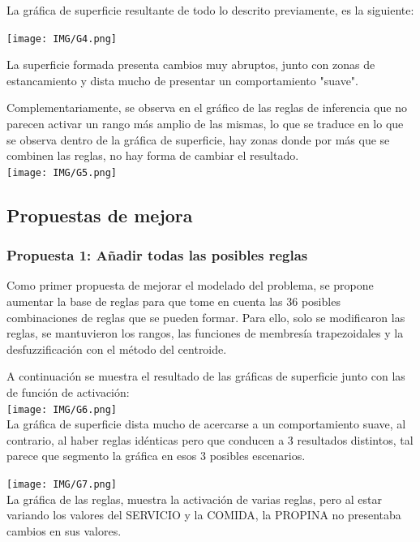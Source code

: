 \documentclass[11pt, letterpaper]{article}
\begin{document}
La gráfica de superficie resultante de todo lo descrito previamente, es la siguiente:

\texttt{[image: IMG/G4.png]}

La superficie formada presenta cambios muy abruptos, junto con zonas de estancamiento y dista mucho de presentar un comportamiento "suave".

\newpage

Complementariamente, se observa en el gráfico de las reglas de inferencia que no parecen activar un rango más amplio de las mismas, lo que se traduce en lo que se observa dentro de la gráfica de superficie, hay zonas donde por más que se combinen las reglas, no hay forma de cambiar el resultado. \\


\texttt{[image: IMG/G5.png]}




\newpage

\subsection{Propuestas de mejora}
\subsubsection{Propuesta 1: Añadir todas las posibles reglas}

Como primer propuesta de mejorar el modelado del problema, se propone aumentar la base de reglas para que tome en cuenta las 36 posibles combinaciones de reglas que se pueden formar. Para ello, solo se modificaron las reglas, se mantuvieron los rangos, las funciones de membresía trapezoidales y la desfuzzificación con el método del centroide.

A continuación se muestra el resultado de las gráficas de superficie junto con las de función de activación: \\


\texttt{[image: IMG/G6.png]} \\

La gráfica de superficie dista mucho de acercarse a un comportamiento suave, al contrario, al haber reglas idénticas pero que conducen a 3 resultados distintos, tal parece que segmento la gráfica en esos 3 posibles escenarios.

\texttt{[image: IMG/G7.png]} \\

La gráfica de las reglas, muestra la activación de varias reglas, pero al estar variando los valores del SERVICIO y la COMIDA, la PROPINA no presentaba cambios en sus valores.
\end{document}
